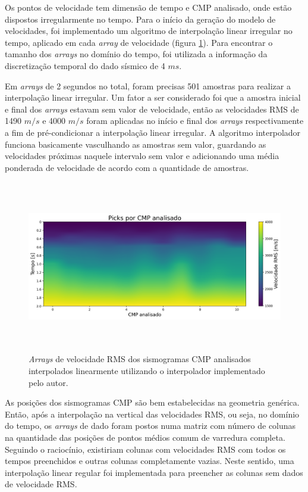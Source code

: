 \documentclass[
	12pt,				%
	openright,			%
	oneside,			%
	a4paper,			%
	english,			%
	brazil				%
	]{abntex2}
\begin{document}
	Os pontos de velocidade tem dimensão de tempo e CMP analisado, onde estão dispostos irregularmente no tempo. Para o início da geração do modelo de velocidades, foi implementado um algoritmo de interpolação linear irregular no tempo, aplicado em cada \textit{array} de velocidade (figura \ref{picksVertInterp}). Para encontrar o tamanho dos \textit{arrays} no domínio do tempo, foi utilizada a informação da discretização temporal do dado sísmico de 4 $ms$. 
	
	Em \textit{arrays} de 2 segundos no total, foram precisas 501 amostras para realizar a interpolação linear irregular. Um fator a ser considerado foi que a amostra inicial e final dos \textit{arrays} estavam sem valor de velocidade, então as velocidades RMS de 1490 $m/s$ e 4000 $m/s$ foram aplicadas no início e final dos \textit{arrays} respectivamente a fim de pré-condicionar a interpolação linear irregular. A algoritmo interpolador funciona basicamente vasculhando as amostras sem valor, guardando as velocidades próximas naquele intervalo sem valor e adicionando uma média ponderada de velocidade de acordo com a quantidade de amostras.    
%
    \begin{figure}[htp!]
		\centering
		\includegraphics[width=16cm,height=7.5cm]{../imagens/picksInterpVertical.png}
		\caption{\textit{Arrays} de velocidade RMS dos sismogramas CMP analisados interpolados linearmente utilizando o interpolador implementado pelo autor.}
		\label{picksVertInterp}
	\end{figure}

	As posições dos sismogramas CMP são bem estabelecidas na geometria genérica. Então, após a interpolação na vertical das velocidades RMS, ou seja, no domínio do tempo, os \textit{arrays} de dado foram postos numa matriz com número de colunas na quantidade das posições de pontos médios comum de varredura completa. Seguindo o raciocínio, existiriam colunas com velocidades RMS com todos os tempos preenchidos e outras colunas completamente vazias. Neste sentido, uma interpolação linear regular foi implementada para preencher as colunas sem dados de velocidade RMS. 
	
\end{document}
